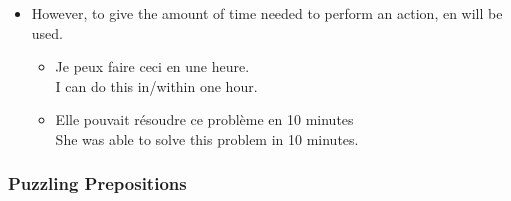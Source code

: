 \begin{itemize}
\begin{itemize}
\begin{itemize}
        \end{itemize}
      \item  However, to give the amount of time needed to perform an action, en will be used.
        \begin{itemize}
          \item  Je peux faire ceci en une heure. \\ I can do this in/within one hour.
          \item  Elle pouvait r{\'e}soudre ce probl{\`e}me en 10 minutes \\ She was able to solve this problem in 10 minutes.
        \end{itemize}
    \end{itemize}
\end{itemize}

\subsubsection{Puzzling Prepositions}

